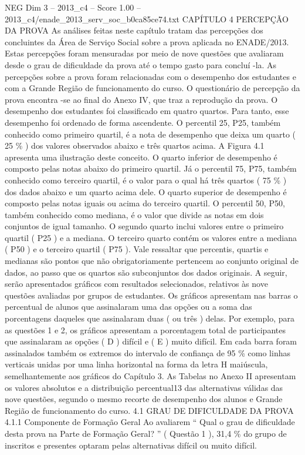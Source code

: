 \begin{textsample}{NEG Dim 3 – 2013\_c4 – Score 1.00 – 2013\_c4/enade\_2013\_serv\_soc\_b0ca85ce74.txt}  \label{ex:f3_neg_140}
CAPÍTULO 4 PERCEPÇÃO DA PROVA As análises feitas neste capítulo tratam das percepções dos concluintes da Área de Serviço Social sobre a prova aplicada no ENADE/2013.
Estas percepções foram mensuradas por meio de nove questões que avaliaram desde o grau de dificuldade da prova até o tempo gasto para concluí -la.
As percepções sobre a prova foram relacionadas com o desempenho dos estudantes e com a Grande Região de funcionamento do curso.
O questionário de percepção da prova encontra -se ao final do Anexo IV, que traz a reprodução da prova.
O desempenho dos estudantes foi classificado em quatro quartos.
Para tanto, esse desempenho foi ordenado de forma ascendente.
O percentil 25, P25, também conhecido como primeiro quartil, é a nota de desempenho que deixa um quarto ( 25 \% ) dos valores observados abaixo e três quartos acima.
A Figura 4.1 apresenta uma ilustração deste conceito.
O quarto inferior de desempenho é composto pelas notas abaixo do primeiro quartil.
Já o percentil 75, P75, também conhecido como terceiro quartil, é o valor para o qual há três quartos ( 75 \% ) dos dados abaixo e um quarto acima dele.
O quarto superior de desempenho é composto pelas notas iguais ou acima do terceiro quartil.
O percentil 50, P50, também conhecido como mediana, é o valor que divide as notas em dois conjuntos de igual tamanho.
O segundo quarto inclui valores entre o primeiro quartil ( P25 ) e a mediana.
O terceiro quarto contém os valores entre a mediana ( P50 ) e o terceiro quartil ( P75 ).
Vale ressaltar que percentis, quartis e medianas são pontos que não obrigatoriamente pertencem ao conjunto original de dados, ao passo que os quartos são subconjuntos dos dados originais.
A seguir, serão apresentados gráficos com resultados selecionados, relativos às nove questões avaliadas por grupos de estudantes.
Os gráficos apresentam nas barras o percentual de alunos que assinalaram uma das opções ou a soma das porcentagens daqueles que assinalaram duas ( ou três ) delas.
Por exemplo, para as questões 1 e 2, os gráficos apresentam a porcentagem total de participantes que assinalaram as opções ( D ) difícil e ( E ) muito difícil.
Em cada barra foram assinalados também os extremos do intervalo de confiança de 95 \% como linhas verticais unidas por uma linha horizontal na forma da letra H maiúscula, semelhantemente aos gráficos do Capítulo 3.
As Tabelas no Anexo II apresentam os valores absolutos e a distribuição percentual13 das alternativas válidas das nove questões, segundo o mesmo recorte de desempenho dos alunos e Grande Região de funcionamento do curso. 4.1 GRAU DE DIFICULDADE DA PROVA 4.1.1 Componente de Formação Geral Ao avaliarem “ Qual o grau de dificuldade desta prova na Parte de Formação Geral? ” ( Questão 1 ), 31,4 \% do grupo de inscritos e presentes optaram pelas alternativas difícil ou muito difícil.

\end{textsample}
